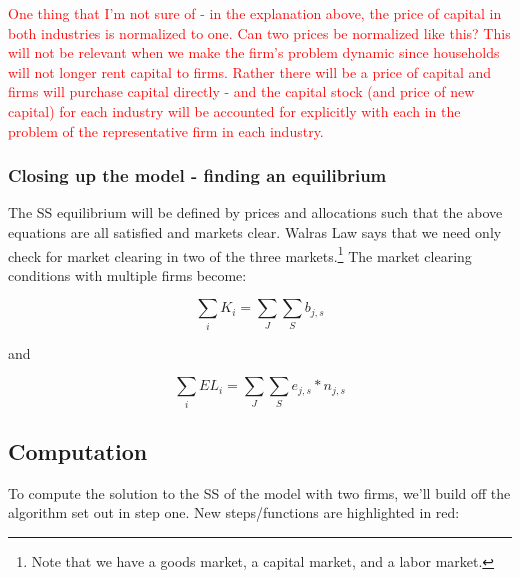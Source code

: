 \documentclass[letterpaper,12pt]{article}
\theoremstyle{definition}
\begin{document}
\begin{spacing}{1.5}
\textcolor{red}{One thing that I'm not sure of - in the explanation above, the price of capital in both industries is normalized to one.  Can two prices be normalized like this?  This will not be relevant when we make the firm's problem dynamic since households will not longer rent capital to firms.  Rather there will be a price of capital and firms will purchase capital directly - and the capital stock (and price of new capital) for each industry will be accounted for explicitly with each in the problem of the representative firm in each industry.}


\subsubsection*{Closing up the model - finding an equilibrium}

The SS equilibrium will be defined by prices and allocations such that the above equations are all satisfied and markets clear.  Walras Law says that we need only check for market clearing in two of the three markets.\footnote{Note that we have a goods market, a capital market, and a labor market.}  The market clearing conditions with multiple firms become:

\begin{equation}
\label{eqn:cap_mkt_clear}
\sum_{i} K_{i} = \sum_{J}\sum_{S}b_{j,s}
\end{equation}

\noindent\noindent and 

\begin{equation}
\sum_{i} EL_{i} = \sum_{J}\sum_{S}e_{j,s}*n_{j,s}
\end{equation}


\subsection*{Computation}

To compute the solution to the SS of the model with two firms, we'll build off the algorithm set out in step one.  New steps/functions are highlighted in red:


\end{spacing}
\end{document}
